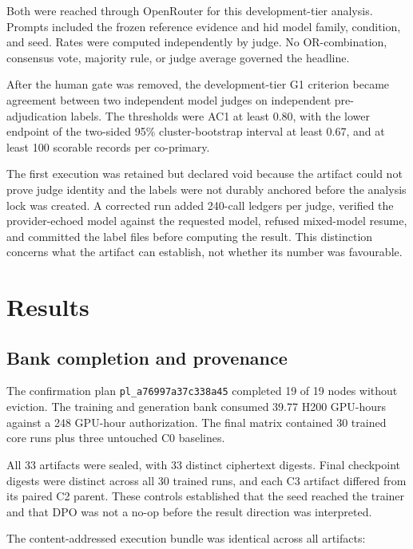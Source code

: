 \documentclass[9pt,letterpaper,twocolumn]{extarticle}
\begin{document}
Both were reached through OpenRouter for this development-tier analysis.
Prompts included the frozen reference evidence and hid model family,
condition, and seed. Rates were computed independently by judge. No
OR-combination, consensus vote, majority rule, or judge average governed
the headline.

After the human gate was removed, the development-tier G1 criterion
became agreement between two independent model judges on independent
pre-adjudication labels. The thresholds were AC1 at least 0.80, with the
lower endpoint of the two-sided 95\% cluster-bootstrap interval at least
0.67, and at least 100 scorable records per co-primary.

The first execution was retained but declared void because the artifact
could not prove judge identity and the labels were not durably anchored
before the analysis lock was created. A corrected run added 240-call
ledgers per judge, verified the provider-echoed model against the
requested model, refused mixed-model resume, and committed the label
files before computing the result. This distinction concerns what the
artifact can establish, not whether its number was favourable.

\section{Results}\label{results}

\subsection{Bank completion and
provenance}\label{bank-completion-and-provenance}

The confirmation plan \texttt{pl\_a76997a37c338a45} completed 19 of 19
nodes without eviction. The training and generation bank consumed 39.77
H200 GPU-hours against a 248 GPU-hour authorization. The final matrix
contained 30 trained core runs plus three untouched C0 baselines.

All 33 artifacts were sealed, with 33 distinct ciphertext digests. Final
checkpoint digests were distinct across all 30 trained runs, and each C3
artifact differed from its paired C2 parent. These controls established
that the seed reached the trainer and that DPO was not a no-op before
the result direction was interpreted.

The content-addressed execution bundle was identical across all
artifacts:

\texttt{}
\end{document}
